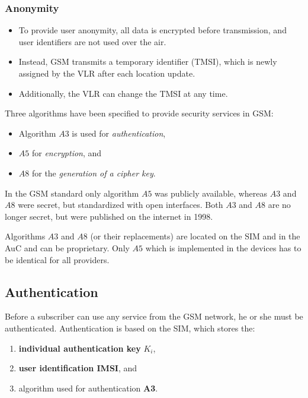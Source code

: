 \subsubsection{Anonymity}
\begin{itemize}
	\item To provide user anonymity, all data is encrypted before transmission, and user identifiers are not used over the air.
	\item Instead, GSM transmits a temporary identifier (TMSI), which is newly assigned by the VLR after each location update.
	\item Additionally, the VLR can change the TMSI at any time.
\end{itemize}

\noindent Three algorithms have been specified to provide security services in GSM:
\begin{itemize}
	\item Algorithm $ A3 $ is used for \textit{authentication},
	\item $ A5 $ for \textit{encryption}, and
	\item $ A8 $ for the \textit{generation of a cipher key}.
\end{itemize}

\noindent In the GSM standard only algorithm $ A5 $ was publicly available, whereas $ A3 $ and $ A8 $ were secret, but standardized with open interfaces. Both $ A3 $ and $ A8 $ are no longer secret, but were published on the internet in 1998. 

Algorithms $ A3 $ and $ A8 $ (or their replacements) are located on the SIM and in the AuC and can be proprietary. Only $ A5 $ which is implemented in the devices has to be identical for all providers.

\subsection{Authentication}\label{sec:challenge-response}
Before a subscriber can use any service from the GSM network, he or she must be authenticated. Authentication is based on the SIM, which stores the: 
\begin{enumerate}
	\item \textbf{individual authentication key} $ K_i $, 
	\item \textbf{user identification IMSI}, and 
	\item algorithm used for authentication \textbf{A3}. 
\end{enumerate}




